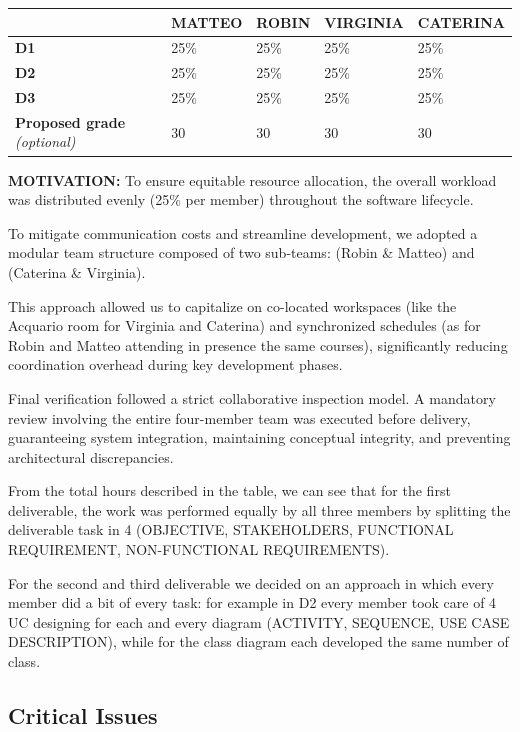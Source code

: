 \documentclass{article}
\begin{document}
\begin{table}[htbp]
\centering
\small
\begin{tabular}{@{} L{0.35\textwidth} C{0.12\textwidth} C{0.12\textwidth} C{0.12\textwidth} C{0.12\textwidth} @{}}
\toprule
 & \textbf{MATTEO} & \textbf{ROBIN} & \textbf{VIRGINIA} & \textbf{CATERINA} \\
\midrule
\textbf{D1} & 25\% & 25\% & 25\% & 25\% \\
\textbf{D2} & 25\% & 25\% & 25\% & 25\% \\
\textbf{D3} & 25\% & 25\% & 25\% & 25\% \\
\midrule
\textbf{Proposed grade} \textit{(optional)} & 30 & 30 & 30 & 30 \\
\bottomrule
\end{tabular}
\end{table}
\textbf{MOTIVATION:} To ensure equitable resource allocation, the overall workload was distributed evenly (25\% per member) throughout the software lifecycle. 
\par To mitigate communication costs and streamline development, we adopted a modular team structure composed of two sub-teams: (Robin \& Matteo) and (Caterina \& Virginia). \par This approach allowed us to capitalize on co-located workspaces (like the Acquario room for Virginia and Caterina) and synchronized schedules (as for Robin and Matteo attending in presence the same courses), significantly reducing coordination overhead during key development phases.
\par Final verification followed a strict collaborative inspection model. A mandatory review involving the entire four-member team was executed before delivery, guaranteeing system integration, maintaining conceptual integrity, and preventing architectural discrepancies.
\par From the total hours described in the table, we can see that for the first deliverable, the work was performed equally by all three members by splitting the deliverable task in 4 (OBJECTIVE, STAKEHOLDERS, FUNCTIONAL REQUIREMENT, NON-FUNCTIONAL REQUIREMENTS). 
\par For the second and third deliverable we decided on an approach in which every member did a bit of every task: for example in D2 every member took care of 4 UC designing for each and every diagram (ACTIVITY, SEQUENCE, USE CASE DESCRIPTION), while for the class diagram each developed the same number of class. 


\subsection{Critical Issues}
\end{document}
